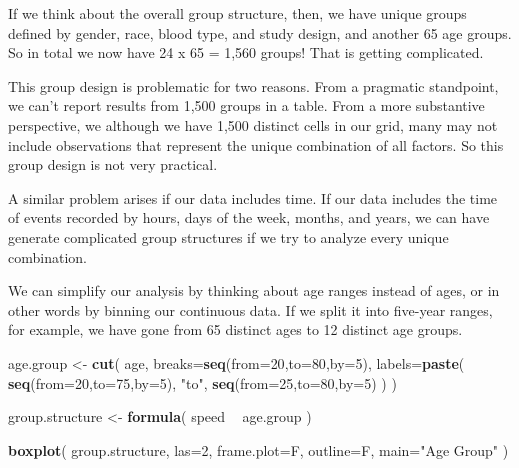 \documentclass[]{book}
\newenvironment{Shaded}{\begin{snugshade}}{\end{snugshade}}
\newcommand{\DataTypeTok}[1]{\textcolor[rgb]{0.13,0.29,0.53}{#1}}
\newcommand{\DecValTok}[1]{\textcolor[rgb]{0.00,0.00,0.81}{#1}}
\newcommand{\KeywordTok}[1]{\textcolor[rgb]{0.13,0.29,0.53}{\textbf{#1}}}
\newcommand{\NormalTok}[1]{#1}
\newcommand{\OperatorTok}[1]{\textcolor[rgb]{0.81,0.36,0.00}{\textbf{#1}}}
\newcommand{\StringTok}[1]{\textcolor[rgb]{0.31,0.60,0.02}{#1}}
\theoremstyle{definition}
\theoremstyle{definition}
\theoremstyle{definition}
\theoremstyle{remark}
\begin{document}
If we think about the overall group structure, then, we have unique
groups defined by gender, race, blood type, and study design, and
another 65 age groups. So in total we now have 24 x 65 = 1,560 groups!
That is getting complicated.

This group design is problematic for two reasons. From a pragmatic
standpoint, we can't report results from 1,500 groups in a table. From a
more substantive perspective, we although we have 1,500 distinct cells
in our grid, many may not include observations that represent the unique
combination of all factors. So this group design is not very practical.

A similar problem arises if our data includes time. If our data includes
the time of events recorded by hours, days of the week, months, and
years, we can have generate complicated group structures if we try to
analyze every unique combination.

We can simplify our analysis by thinking about age ranges instead of
ages, or in other words by binning our continuous data. If we split it
into five-year ranges, for example, we have gone from 65 distinct ages
to 12 distinct age groups.

\begin{Shaded}
\begin{Highlighting}[]
\NormalTok{age.group <-}\StringTok{ }\KeywordTok{cut}\NormalTok{( age, }
                  \DataTypeTok{breaks=}\KeywordTok{seq}\NormalTok{(}\DataTypeTok{from=}\DecValTok{20}\NormalTok{,}\DataTypeTok{to=}\DecValTok{80}\NormalTok{,}\DataTypeTok{by=}\DecValTok{5}\NormalTok{),}
                  \DataTypeTok{labels=}\KeywordTok{paste}\NormalTok{( }\KeywordTok{seq}\NormalTok{(}\DataTypeTok{from=}\DecValTok{20}\NormalTok{,}\DataTypeTok{to=}\DecValTok{75}\NormalTok{,}\DataTypeTok{by=}\DecValTok{5}\NormalTok{), }\StringTok{"to"}\NormalTok{, }\KeywordTok{seq}\NormalTok{(}\DataTypeTok{from=}\DecValTok{25}\NormalTok{,}\DataTypeTok{to=}\DecValTok{80}\NormalTok{,}\DataTypeTok{by=}\DecValTok{5}\NormalTok{) ) )}

\NormalTok{group.structure <-}\StringTok{ }\KeywordTok{formula}\NormalTok{( speed }\OperatorTok{~}\StringTok{ }\NormalTok{age.group )}

\KeywordTok{boxplot}\NormalTok{( group.structure, }\DataTypeTok{las=}\DecValTok{2}\NormalTok{, }\DataTypeTok{frame.plot=}\NormalTok{F, }\DataTypeTok{outline=}\NormalTok{F, }\DataTypeTok{main=}\StringTok{"Age Group"}\NormalTok{  )}
\end{Highlighting}
\end{Shaded}
\end{document}
